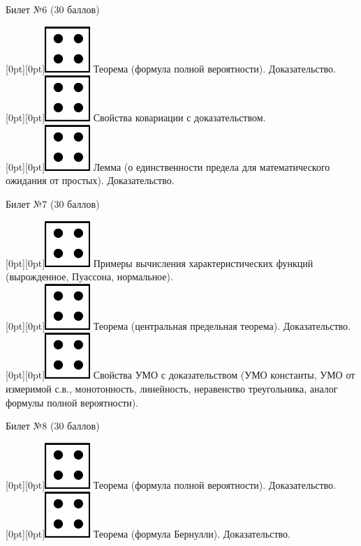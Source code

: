 \documentclass[10pt]{article}
\begin{document}
\begin{center} {\Large Билет №6 (30 баллов)} \end{center}
\raisebox{-1pt}[0pt][0pt]{\includegraphics[width=0.02\linewidth]{4.png}} Теорема (формула полной вероятности). Доказательство. \\
\raisebox{-1pt}[0pt][0pt]{\includegraphics[width=0.02\linewidth]{4.png}} Свойства ковариации с доказательством. \\
\raisebox{-1pt}[0pt][0pt]{\includegraphics[width=0.02\linewidth]{4.png}} Лемма (о единственности предела для математического ожидания от простых). Доказательство. \\ 
\begin{center} {\Large Билет №7 (30 баллов)} \end{center}
\raisebox{-1pt}[0pt][0pt]{\includegraphics[width=0.02\linewidth]{4.png}} Примеры вычисления характеристических функций (вырожденное, Пуассона, нормальное). \\
\raisebox{-1pt}[0pt][0pt]{\includegraphics[width=0.02\linewidth]{4.png}} Теорема (центральная предельная теорема). Доказательство. \\        
\raisebox{-1pt}[0pt][0pt]{\includegraphics[width=0.02\linewidth]{4.png}} Свойства УМО с доказательством (УМО константы, УМО от измеримой с.в., монотонность,  линейность, неравенство треугольника,  аналог формулы полной вероятности). \\
\begin{center} {\Large Билет №8 (30 баллов)} \end{center}
\raisebox{-1pt}[0pt][0pt]{\includegraphics[width=0.02\linewidth]{4.png}} Теорема (формула полной вероятности). Доказательство. \\
\raisebox{-1pt}[0pt][0pt]{\includegraphics[width=0.02\linewidth]{4.png}} Теорема (формула Бернулли). Доказательство. \\
\end{document}
